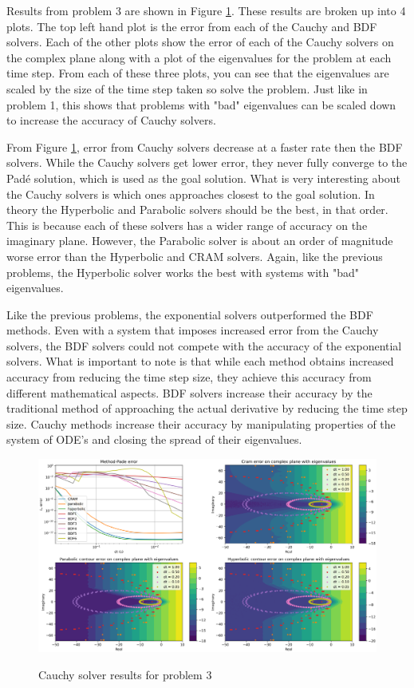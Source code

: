 Results from problem 3 are shown in Figure \ref{fig:problem3results}. These results are broken up into 4 plots. The top left hand plot is the error from each of the Cauchy and BDF solvers. Each of the other plots show the error of each of the Cauchy solvers on the complex plane along with a plot of the eigenvalues for the problem at each time step. From each of these three plots, you can see that the eigenvalues are scaled by the size of the time step taken so solve the problem. Just like in problem 1, this shows that problems with "bad" eigenvalues can be scaled down to increase the accuracy of Cauchy solvers. 

From Figure \ref{fig:problem3results}, error from Cauchy solvers decrease at a faster rate then the BDF solvers. While the Cauchy solvers get lower error, they never fully converge to the Pad\'e solution, which is used as the goal solution. What is very interesting about the Cauchy solvers is which ones approaches closest to the goal solution. In theory the Hyperbolic and Parabolic solvers should be the best, in that order. This is because each of these solvers has a wider range of accuracy on the imaginary plane. However, the Parabolic solver is about an order of magnitude worse error than the Hyperbolic and CRAM solvers. Again, like the previous problems, the Hyperbolic solver works the best with systems with "bad" eigenvalues. 

Like the previous problems, the exponential solvers outperformed the BDF methods. Even with a system that imposes increased error from the Cauchy solvers, the BDF solvers could not compete with the accuracy of the exponential solvers. What is important to note is that while each method obtains increased accuracy from reducing the time step size, they achieve this accuracy from different mathematical aspects. BDF solvers increase their accuracy by the traditional method of approaching the actual derivative by reducing the time step size. Cauchy methods increase their accuracy by manipulating properties of the system of ODE's and closing the spread of their eigenvalues. 


\FloatBarrier

\begin{figure}
  \centering
  \includegraphics[width=9in]{images/problem3results.png}\\
  \caption{Cauchy solver results for problem 3}
  \label{fig:problem3results}
\end{figure} 
